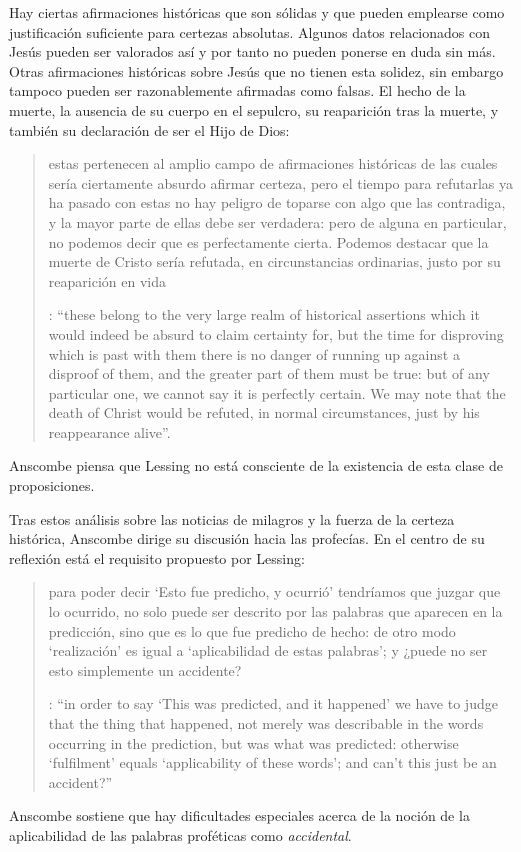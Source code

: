 Hay ciertas afirmaciones históricas que son sólidas y que pueden emplearse como justificación suficiente para certezas absolutas. Algunos datos relacionados con Jesús pueden ser valorados así y por tanto no pueden ponerse en duda sin más. Otras afirmaciones históricas sobre Jesús que no tienen esta solidez, sin embargo tampoco pueden ser razonablemente afirmadas como falsas. El hecho de la muerte, la ausencia de su cuerpo en el sepulcro, su reaparición tras la muerte, y también su declaración de ser el Hijo de Dios: \blockquote[{\Cite[28]{anscombe2008faith:prophandmi}}: \enquote{these belong to the very large realm of historical assertions which it would indeed be absurd to claim certainty for, but the time for disproving which is past \textelp{} with them there is no danger of running up against a disproof of them, and the greater part of them must be true: but of any particular one, we cannot say it is perfectly certain. We may note that the death of Christ would be refuted, in normal circumstances, just by his reappearance alive}.]{estas pertenecen al amplio campo de afirmaciones históricas de las cuales sería ciertamente absurdo afirmar certeza, pero el tiempo para refutarlas ya ha pasado \textelp{} con estas no hay peligro de toparse con algo que las contradiga, y la mayor parte de ellas debe ser verdadera: pero de alguna en particular, no podemos decir que es perfectamente cierta. Podemos destacar que la muerte de Cristo sería refutada, en circunstancias ordinarias, justo por su reaparición en vida}. Anscombe piensa que Lessing no está consciente de la existencia de esta clase de proposiciones.

Tras estos análisis sobre las noticias de milagros y la fuerza de la certeza histórica, Anscombe dirige su discusión hacia las profecías. En el centro de su reflexión está el requisito propuesto por Lessing: \blockquote[{\Cite[29]{anscombe2008faith:prophandmi}}: \enquote{in order to say `This was predicted, and it happened' we have to judge that the thing that happened, not merely was describable in the words occurring in the prediction, but was what was predicted: otherwise `fulfilment' equals `applicability of these words'; and can't this just be an accident?}]{para poder decir `Esto fue predicho, y ocurrió' tendríamos que juzgar que lo ocurrido, no solo puede ser descrito por las palabras que aparecen en la predicción, sino que es lo que fue predicho de hecho: de otro modo `realización' es igual a `aplicabilidad de estas palabras'; y ¿puede no ser esto simplemente un accidente?} Anscombe sostiene que hay dificultades especiales acerca de la noción de la aplicabilidad de las palabras proféticas como \emph{accidental}.

